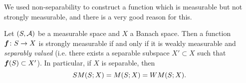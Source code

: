 
We used non-separability to construct a function which is measurable but not strongly measurable, and there is a very good reason for this.

\begin{thm}\label{thm:Pettis-measurability}
  Let $(S,\mathcal{A})$ be a measurable space and $X$ a Banach space.
  Then a function $\bm{f} \colon S \rightarrow X$ is strongly measurable if and only if it is weakly measurable and \emph{separably valued} (i.e. there exists a separable subspace $X' \subset X$ such that $\bm{f}(S) \subset X'$).
  In particular, if $X$ is separable, then
  \begin{equation*}
    SM(S;X) = M(S;X) = WM(S;X).
  \end{equation*}
\end{thm}


